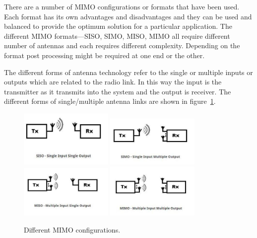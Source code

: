 There are a number of MIMO configurations or formats that have been used. Each format has its own advantages and disadvantages and they can be used and balanced to provide the optimum solution for a particular application. The different MIMO formats---SISO, SIMO, MISO, MIMO all require different number of antennas and each requires different complexity. Depending on the format post processing might be required at one end or the other.

The different forms of antenna technology refer to the single or multiple inputs or outputs which are related to the radio link. In this way the input is the transmitter as it transmits into the system and the output is receiver. The different forms of single/multiple antenna links are shown in figure~\ref{fig:mimo_config}.

\begin{figure}
\centering
\includegraphics[width=0.4\textwidth]{images/SISO.jpg}
\qquad
\includegraphics[width=0.4\textwidth]{images/SIMO.jpg}
\\
\includegraphics[width=0.4\textwidth]{images/MISO.jpg}
\qquad
\includegraphics[width=0.4\textwidth]{images/MIMO.jpg}
\caption{Different MIMO configurations.}
\label{fig:mimo_config}
\end{figure}


